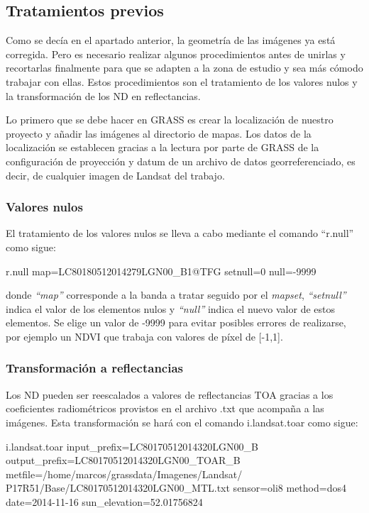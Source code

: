 \subsection{Tratamientos previos}
Como se decía en el apartado anterior, la geometría de las imágenes ya está corregida. Pero es necesario realizar algunos procedimientos antes de unirlas y recortarlas finalmente para que se adapten a la zona de estudio y sea más cómodo trabajar con ellas. Estos procedimientos son el tratamiento de los valores nulos y la transformación de los \ac{ND} en reflectancias.\Sep

Lo primero que se debe hacer en GRASS es crear la localización de nuestro proyecto y añadir las imágenes al directorio de mapas. Los datos de la localización se establecen gracias a la lectura por parte de GRASS de la configuración de proyección y datum de un archivo de datos georreferenciado, es decir, de cualquier imagen de Landsat del trabajo.

\subsubsection{Valores nulos}
El tratamiento de los valores nulos se lleva a cabo mediante el comando ``r.null'' como sigue:

\begin{center}
\begin{boxedverbatim}
	r.null map=LC80180512014279LGN00_B1@TFG setnull=0 null=-9999
\end{boxedverbatim}
\end{center}

donde \textit{``map''} corresponde a la banda a tratar seguido por el \textit{mapset}, \textit{``setnull''} indica el valor de los elementos nulos y \textit{``null''} indica el nuevo valor de estos elementos. Se elige un valor de -9999 para evitar posibles errores de realizarse, por ejemplo un \ac{NDVI} que trabaja con valores de píxel de [-1,1].

\subsubsection{Transformación a reflectancias}
Los \ac{ND} pueden ser reescalados a valores de reflectancias \ac{TOA} gracias a los coeficientes radiométricos provistos en el archivo .txt que acompaña a las imágenes. Esta transformación se hará con el comando i.landsat.toar como sigue:
\begin{center}
\begin{boxedverbatim}
	i.landsat.toar
	input_prefix=LC80170512014320LGN00_B
	output_prefix=LC80170512014320LGN00_TOAR_B
	metfile=/home/marcos/grassdata/Imagenes/Landsat/
	P17R51/Base/LC80170512014320LGN00_MTL.txt
	sensor=oli8
	method=dos4
	date=2014-11-16
	sun_elevation=52.01756824
\end{boxedverbatim}
\end{center}

